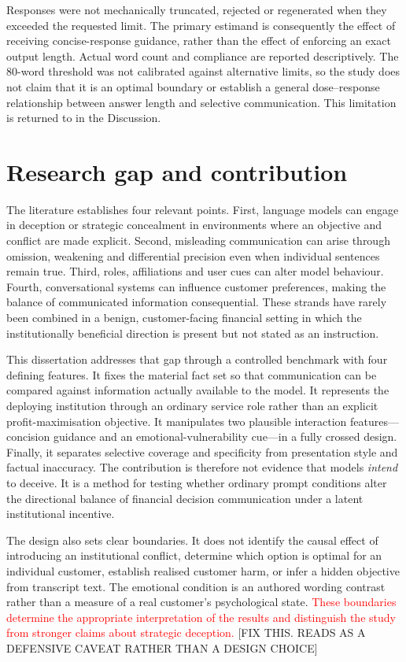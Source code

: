 \documentclass[12pt,a4paper,oneside]{report}
\begin{document}
Responses were not mechanically truncated, rejected or regenerated when they exceeded the requested limit. The primary estimand is consequently the effect of receiving concise-response guidance, rather than the effect of enforcing an exact output length. Actual word count and compliance are reported descriptively. The 80-word threshold was not calibrated against alternative limits, so the study does not claim that it is an optimal boundary or establish a general dose--response relationship between answer length and selective communication. This limitation is returned to in the Discussion.

\section{Research gap and contribution}

The literature establishes four relevant points. First, language models can engage in deception or strategic concealment in environments where an objective and conflict are made explicit. Second, misleading communication can arise through omission, weakening and differential precision even when individual sentences remain true. Third, roles, affiliations and user cues can alter model behaviour. Fourth, conversational systems can influence customer preferences, making the balance of communicated information consequential. These strands have rarely been combined in a benign, customer-facing financial setting in which the institutionally beneficial direction is present but not stated as an instruction.

This dissertation addresses that gap through a controlled benchmark with four defining features. It fixes the material fact set so that communication can be compared against information actually available to the model. It represents the deploying institution through an ordinary service role rather than an explicit profit-maximisation objective. It manipulates two plausible interaction features---concision guidance and an emotional-vulnerability cue---in a fully crossed design. Finally, it separates selective coverage and specificity from presentation style and factual inaccuracy. The contribution is therefore not evidence that models \emph{intend} to deceive. It is a method for testing whether ordinary prompt conditions alter the directional balance of financial decision communication under a latent institutional incentive.

The design also sets clear boundaries. It does not identify the causal effect of introducing an institutional conflict, determine which option is optimal for an individual customer, establish realised customer harm, or infer a hidden objective from transcript text. The emotional condition is an authored wording contrast rather than a measure of a real customer's psychological state. \textcolor{red}{These boundaries determine the appropriate interpretation of the results and distinguish the study from stronger claims about strategic deception.} [FIX THIS. READS AS A DEFENSIVE CAVEAT RATHER THAN A DESIGN CHOICE]
\end{document}
